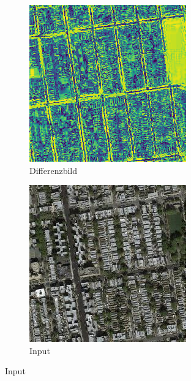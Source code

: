 \begin{figure}[ht]
\begin{subfigure}[t]{.14\textwidth}
  \end{subfigure}
  \begin{subfigure}[t]{.14\textwidth}
    \centering
    \caption*{Differenzbild}
    \includegraphics[width=\linewidth]{images/cycleGanResults/Maps9_diff.png}
  \end{subfigure}
  \hfill
  \begin{subfigure}[t]{.14\textwidth}
    \centering
    \caption*{Input}
    \includegraphics[width=\linewidth]{images/cycleGanResults/Satelite19_Or_Ld120_E100_Lr0002.jpg}

\end{subfigure}
\end{figure}
